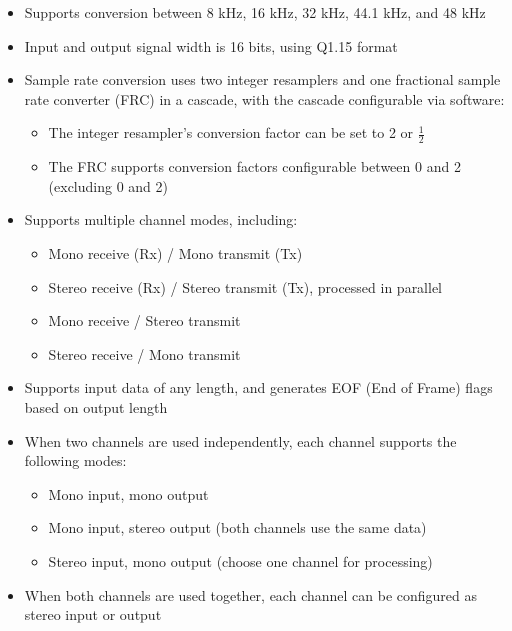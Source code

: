 \documentclass[main\_\_EN.tex]{subfiles}
\begin{document}
\begin{itemize}
    \item Supports conversion between 8 kHz, 16 kHz, 32 kHz, 44.1 kHz, and 48 kHz
    \item Input and output signal width is 16 bits, using Q1.15 format
    \item Sample rate conversion uses two integer resamplers and one fractional sample rate converter (FRC) in a cascade, with the cascade configurable via software:
      \begin{itemize}
        \item The integer resampler’s conversion factor can be set to 2 or $\frac{1}{2}$
        \item The FRC supports conversion factors configurable between 0 and 2 (excluding 0 and 2)
     \end{itemize}

    \item Supports multiple channel modes, including:
    \begin{itemize}
        \item Mono receive (Rx) / Mono transmit (Tx)
        \item Stereo receive (Rx) / Stereo transmit (Tx), processed in parallel
        \item Mono receive / Stereo transmit
        \item Stereo receive / Mono transmit
    \end{itemize}
    \item Supports input data of any length, and generates EOF (End of Frame) flags based on output length
    \item When two channels are used independently, each channel supports the following modes:
    \begin{itemize}
        \item Mono input, mono output
        \item Mono input, stereo output (both channels use the same data)
        \item Stereo input, mono output (choose one channel for processing)
    \end{itemize}
    \item When both channels are used together, each channel can be configured as stereo input or output
\end{itemize}

\end{document}
